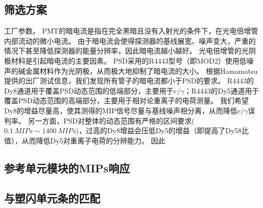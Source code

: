 \subsection{筛选方案}
工厂参数。
PMT的暗电流是指在完全黑暗且没有入射光的条件下，在光电倍增管内部流动的微小电流。
由于暗电流会使得探测器的基线展宽、噪声变大，严重的情况下甚至降低探测器的能量分辨率，因此暗电流越小越好。
光电倍增管的光阴极材料是引起暗电流的主要因素。
PSD采用的R4443型号（即MOD2）使用低噪声的碱金属材料作为光阴极，从而极大地抑制了暗电流的大小。
根据Hamamatsu提供的出厂测试信息，我们发现所有管子的暗电流都小于PSD的要求。
R4443的Dy8通道用于覆盖PSD动态范围的低端部分，主要用于$e/\gamma$；R4443的Dy5通道用于覆盖PSD动态范围的高端部分，主要用于相对论重离子的电荷测量。
我们希望Dy8的增益尽量高，使其测得的MIP信号尽量与基线噪声相分离，从而降低$e/\gamma$误判率。
另一方面，PSD对整体的动态范围有严格的区间要求($\SI{0.1}{MIPs}\sim\SI{1400}{MIPs}$)，过高的Dy8增益会压低Dy5的增益（即提高了Dy58比值），从而降低Dy5对重离子电荷的分辨能力。
因此
\subsection{参考单元模块的MIPs响应}
\subsection{与塑闪单元条的匹配}